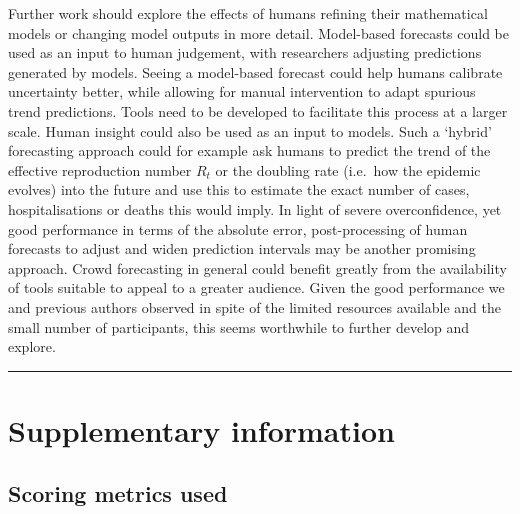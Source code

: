\documentclass[
]{article}
\begin{document}
Further work should explore the effects of humans refining their mathematical models or changing model outputs in more detail. Model-based forecasts could be used as an input to human judgement, with researchers adjusting predictions generated by models. Seeing a model-based forecast could help humans calibrate uncertainty better, while allowing for manual intervention to adapt spurious trend predictions. Tools need to be developed to facilitate this process at a larger scale. Human insight could also be used as an input to models. Such a `hybrid' forecasting approach could for example ask humans to predict the trend of the effective reproduction number \(R_t\) or the doubling rate (i.e.~how the epidemic evolves) into the future and use this to estimate the exact number of cases, hospitalisations or deaths this would imply. In light of severe overconfidence, yet good performance in terms of the absolute error, post-processing of human forecasts to adjust and widen prediction intervals may be another promising approach. Crowd forecasting in general could benefit greatly from the availability of tools suitable to appeal to a greater audience. Given the good performance we and previous authors observed in spite of the limited resources available and the small number of participants, this seems worthwhile to further develop and explore.

\begin{center}\rule{0.5\linewidth}{0.5pt}\end{center}

\hypertarget{appendix-supplementary-information}{%
\appendix}


\hypertarget{supplementary-information}{%
\section{Supplementary information}\label{supplementary-information}}

\hypertarget{scoring-metrics-used}{%
\subsection{Scoring metrics used}\label{scoring-metrics-used}}
\end{document}
